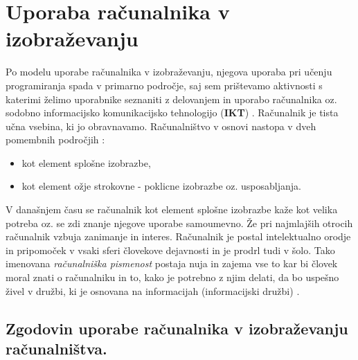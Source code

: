 
\section{Uporaba računalnika v izobraževanju}
\label{sec:uporaba-raunalnika-v}

Po modelu uporabe računalnika v izobraževanju, njegova uporaba pri
učenju programiranja spada v primarno področje, saj sem prištevamo
aktivnosti s katerimi želimo uporabnike seznaniti z delovanjem in
uporabo računalnika oz. sodobno informacijsko komunikacijsko
tehnologijo (\textbf{IKT}) \cite{model_uporabe_rac_izo-web}. Računalnik
je tista učna vsebina, ki jo obravnavamo. Računalništvo v osnovi
nastopa v dveh pomembnih področjih \cite{gerlic_2000}:

\begin{itemize}
\item kot element splošne izobrazbe,
\item kot element ožje strokovne - poklicne izobrazbe
  oz. usposabljanja.
\end{itemize}

V današnjem času se računalnik kot element splošne izobrazbe kaže kot
velika potreba oz. se zdi znanje njegove uporabe samoumevno. Že pri
najmlajših otrocih računalnik vzbuja zanimanje in interes.  Računalnik
je postal intelektualno orodje in pripomoček v vsaki sferi človekove
dejavnosti in je prodrl tudi v šolo. Tako imenovana \emph{računalniška
  pismenost} postaja nuja in zajema vse to kar bi človek moral znati o
računalniku in to, kako je potrebno z njim delati, da bo uspešno živel
v družbi, ki je osnovana na informacijah (informacijski družbi)
\cite{klemencic_2011}.





\subsection{Zgodovin uporabe računalnika v izobraževanju
računalništva.}\label{zgodovina_uporabe_racunalnika_v_izobrazevanju}


